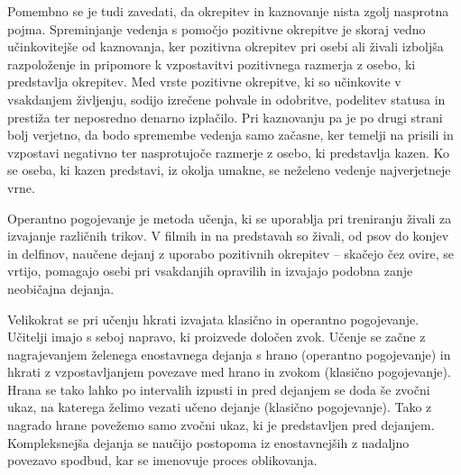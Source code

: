 \documentclass[a4paper, oneside, 12pt]{report}
\begin{document}
Pomembno se je tudi zavedati, da okrepitev in kaznovanje nista zgolj nasprotna pojma. Spreminjanje vedenja s pomočjo pozitivne okrepitve je skoraj vedno učinkovitejše od kaznovanja, ker pozitivna okrepitev pri osebi ali živali izboljša razpoloženje in pripomore k vzpostavitvi pozitivnega razmerja z osebo, ki predstavlja okrepitev. Med vrste pozitivne okrepitve, ki so učinkovite v vsakdanjem življenju, sodijo izrečene pohvale in odobritve, podelitev statusa in prestiža ter neposredno denarno izplačilo. Pri kaznovanju pa je po drugi strani bolj verjetno, da bodo spremembe vedenja samo začasne, ker temelji na prisili in vzpostavi negativno ter nasprotujoče razmerje z osebo, ki predstavlja kazen. Ko se oseba, ki kazen predstavi, iz okolja umakne, se neželeno vedenje najverjetneje vrne.~\cite{IntroductionToPsychology}

Operantno pogojevanje je metoda učenja, ki se uporablja pri treniranju živali za izvajanje različnih trikov. V filmih in na predstavah so živali, od psov do konjev in delfinov, naučene dejanj z uporabo pozitivnih okrepitev -- skačejo čez ovire, se vrtijo, pomagajo osebi pri vsakdanjih opravilih in izvajajo podobna zanje neobičajna dejanja.~\cite{IntroductionToPsychology}

Velikokrat se pri učenju hkrati izvajata klasično in operantno pogojevanje. Učitelji imajo s seboj napravo, ki proizvede določen zvok. Učenje se začne z nagrajevanjem želenega enostavnega dejanja s hrano (operantno pogojevanje) in hkrati z vzpostavljanjem povezave med hrano in zvokom (klasično pogojevanje). Hrana se tako lahko po intervalih izpusti in pred dejanjem se doda še zvočni ukaz, na katerega želimo vezati učeno dejanje (klasično pogojevanje). Tako z nagrado hrane povežemo samo zvočni ukaz, ki je predstavljen pred dejanjem. Kompleksnejša dejanja se naučijo postopoma iz enostavnejših z nadaljno povezavo spodbud, kar se imenovuje proces oblikovanja.~\cite{IntroductionToPsychology}

\end{document}
